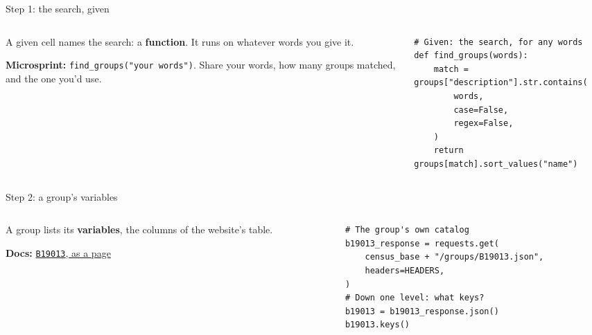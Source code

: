 \documentclass[9pt,aspectratio=169]{beamer}
\begin{document}
\begin{frame}[fragile]{Step 1: the search, given}
    \begin{columns}[T]
        \begin{column}{0.37\textwidth}
            A given cell names the search: a \textbf{function}. It runs on whatever words you give it.

            \medskip
            \textbf{Microsprint:} \texttt{find\_groups("your words")}. Share your words, how many groups matched, and the one you'd use.
        \end{column}
        \begin{column}{0.6\textwidth}
\begin{lstlisting}
# Given: the search, for any words
def find_groups(words):
    match = groups["description"].str.contains(
        words,
        case=False,
        regex=False,
    )
    return groups[match].sort_values("name")
\end{lstlisting}
        \end{column}
    \end{columns}
\end{frame}

\begin{frame}[fragile]{Step 2: a group's variables}
    \begin{columns}[T]
        \begin{column}{0.37\textwidth}
            A group lists its \textbf{variables}, the columns of the website's table.

            \medskip
            {\scriptsize\textbf{Docs:} \href{https://api.census.gov/data/2024/acs/acs5/groups/B19013.html}{\texttt{B19013}, as a page}\par}
        \end{column}
        \begin{column}{0.6\textwidth}
\begin{lstlisting}
# The group's own catalog
b19013_response = requests.get(
    census_base + "/groups/B19013.json",
    headers=HEADERS,
)
# Down one level: what keys?
b19013 = b19013_response.json()
b19013.keys()
\end{lstlisting}
        \end{column}
    \end{columns}
\end{frame}
\end{document}

